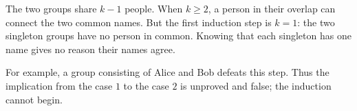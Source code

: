 The two groups share $k-1$ people. When $k\ge2$, a person in their overlap can connect the two common names. But the first induction step is $k=1$: the two singleton groups have no person in common. Knowing that each singleton has one name gives no reason their names agree.

For example, a group consisting of Alice and Bob defeats this step. Thus the implication from the case $1$ to the case $2$ is unproved and false; the induction cannot begin.
